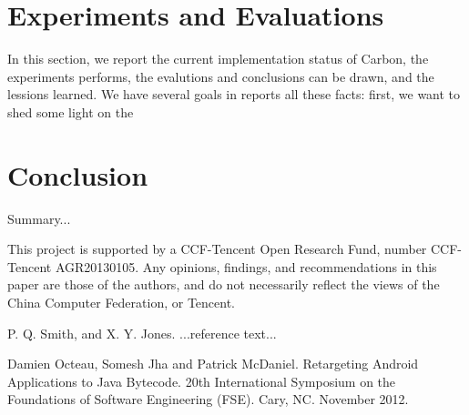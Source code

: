 \documentclass[preprint, cm]{sigplanconf}
\begin{document}
\section{Experiments and Evaluations}\label{sec-exp}
In this section, we report the current implementation
status of Carbon, the experiments performs, the evalutions
and conclusions can be drawn, and the lessions learned. We
have several goals in reports all these facts: first, we
want to shed some light on the 

\section{Conclusion}\label{sec-conclusion}

Summary...

\acks

This project is supported by a CCF-Tencent
Open Research Fund, number CCF-Tencent AGR20130105. Any
opinions, findings, and recommendations in this paper are those
of the authors, and do not
necessarily reflect the views of the China Computer Federation, or
Tencent.





\begin{thebibliography}{}
\softraggedright

P. Q. Smith, and X. Y. Jones. ...reference text...

Damien Octeau, Somesh Jha and Patrick McDaniel. Retargeting 
Android Applications to Java Bytecode. 20th International 
Symposium on the Foundations of Software Engineering (FSE). Cary, NC. November 2012.

\end{thebibliography}
\end{document}

